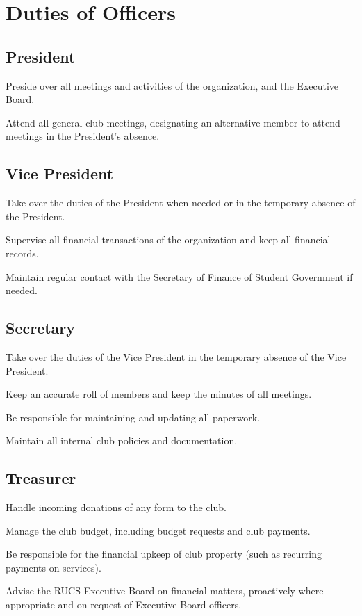 \documentclass[a4paper]{article}
\begin{document}
\section{Duties of Officers}
\subsection{President}
\begin{subroutines}
	\item Preside over all meetings and activities of the organization, and the Executive Board.
	\item Attend all general club meetings, designating an alternative member to attend meetings in the President's absence.
\end{subroutines}
\subsection{Vice President}
\begin{subroutines}
	\item Take over the duties of the President when needed or in the temporary absence of the President.
	\item Supervise all financial transactions of the organization and keep all financial records.
	\item Maintain regular contact with the Secretary of Finance of Student Government if needed.
\end{subroutines}
\subsection{Secretary}
\begin{subroutines}
	\item Take over the duties of the Vice President in the temporary absence of the Vice President.
	\item Keep an accurate roll of members and keep the minutes of all meetings.
	\item Be responsible for maintaining and updating all paperwork.
	\item Maintain all internal club policies and documentation.
\end{subroutines}
\subsection{Treasurer}
\begin{subroutines}
        \item Handle incoming donations of any form to the club.
        \item Manage the club budget, including budget requests and club payments.
        \item Be responsible for the financial upkeep of club property (such as recurring payments on services).
        \item Advise the RUCS Executive Board on financial matters, proactively where appropriate and on request of Executive Board officers.
\end{subroutines}
\end{document}
